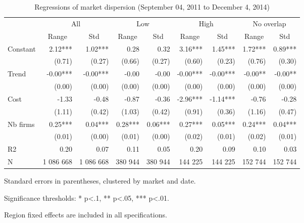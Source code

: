 \documentclass[english]{article}
\begin{document}
\begin{table}[htb!] %
\caption{Regressions of market dispersion (September 04, 2011 to December 4, 2014)}
\label{tab:regs_market_dispersion_all}
\begin{threeparttable}
\begin{tabular}{lrrrrrrrr}
    \toprule
    \toprule
          & \multicolumn{2}{c}{All} & \multicolumn{2}{c}{Low} & \multicolumn{2}{c}{High} & \multicolumn{2}{c}{No overlap} \\
          & \multicolumn{1}{c}{Range} & \multicolumn{1}{c}{Std} & \multicolumn{1}{c}{Range} & \multicolumn{1}{c}{Std} & \multicolumn{1}{c}{Range} & \multicolumn{1}{c}{Std} & \multicolumn{1}{c}{Range} & \multicolumn{1}{c}{Std} \\
    \midrule
    Constant & 2.12*** & 1.02*** & 0.28  & 0.32  & 3.16*** & 1.45*** & 1.72*** & 0.89*** \\
          & (0.71) & (0.27) & (0.66) & (0.27) & (0.60) & (0.23) & (0.76) & (0.30) \\
    Trend & -0.00*** & -0.00*** & -0.00 & -0.00 & -0.00*** & -0.00*** & -0.00** & -0.00** \\
          & (0.00) & (0.00) & (0.00) & (0.00) & (0.00) & (0.00) & (0.00) & (0.00) \\
    Cost  & -1.33 & -0.48 & -0.87 & -0.36 & -2.96*** & -1.14*** & -0.76 & -0.28 \\
          & (1.11) & (0.42) & (1.03) & (0.42) & (0.91) & (0.36) & (1.16) & (0.47) \\
    Nb firms & 0.25*** & 0.04*** & 0.28*** & 0.06*** & 0.27*** & 0.05*** & 0.24*** & 0.04*** \\
          & (0.01) & (0.00) & (0.01) & (0.00) & (0.02) & (0.01) & (0.02) & (0.01) \\
    \midrule
    R2    & 0.20  & 0.07  & 0.11  & 0.05  & 0.20  & 0.09  & 0.10  & 0.03 \\
    N     & 1 086  668 & 1 086  668 & 380  944 & 380  944 & 144  225 & 144  225 & 152  744 & 152  744 \\
    \bottomrule
    \bottomrule
\end{tabular}
\begin{tablenotes}
      \small
      \item Standard errors in parentheses, clustered by market and date.
      \item Significance thresholds: * p<.1, ** p<.05, *** p<.01.
      \item Region fixed effects are included in all specifications.
\end{tablenotes}
\end{threeparttable}
\end{table}
\end{document}

